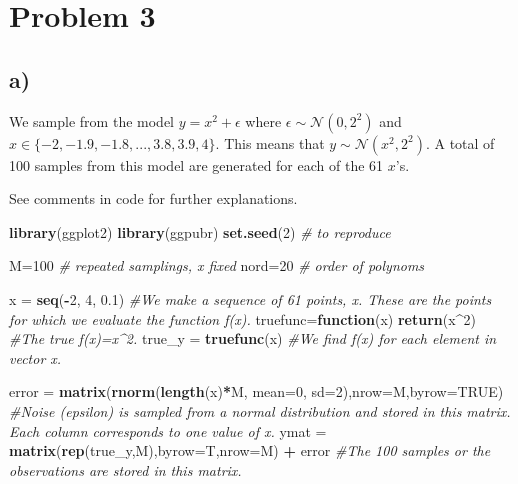 \documentclass[]{article}
\newenvironment{Shaded}{\begin{snugshade}}{\end{snugshade}}
\newcommand{\KeywordTok}[1]{\textcolor[rgb]{0.13,0.29,0.53}{\textbf{#1}}}
\newcommand{\DataTypeTok}[1]{\textcolor[rgb]{0.13,0.29,0.53}{#1}}
\newcommand{\DecValTok}[1]{\textcolor[rgb]{0.00,0.00,0.81}{#1}}
\newcommand{\FloatTok}[1]{\textcolor[rgb]{0.00,0.00,0.81}{#1}}
\newcommand{\StringTok}[1]{\textcolor[rgb]{0.31,0.60,0.02}{#1}}
\newcommand{\CommentTok}[1]{\textcolor[rgb]{0.56,0.35,0.01}{\textit{#1}}}
\newcommand{\OtherTok}[1]{\textcolor[rgb]{0.56,0.35,0.01}{#1}}
\newcommand{\ControlFlowTok}[1]{\textcolor[rgb]{0.13,0.29,0.53}{\textbf{#1}}}
\newcommand{\OperatorTok}[1]{\textcolor[rgb]{0.81,0.36,0.00}{\textbf{#1}}}
\newcommand{\NormalTok}[1]{#1}
\begin{document}
\section{Problem 3}\label{problem-3}

\subsection{a)}\label{a}

We sample from the model \(y=x^2+\epsilon\) where
\(\epsilon \sim \mathcal{N}(0,2^2)\) and
\(x\in \{-2,-1.9,-1.8,...,3.8,3.9,4\}\). This means that
\(y \sim \mathcal{N}(x^2,2^2)\). A total of 100 samples from this model
are generated for each of the 61 \(x\)'s.

See comments in code for further explanations.

\begin{Shaded}
\begin{Highlighting}[]
\KeywordTok{library}\NormalTok{(ggplot2)}
\KeywordTok{library}\NormalTok{(ggpubr)}
\KeywordTok{set.seed}\NormalTok{(}\DecValTok{2}\NormalTok{) }\CommentTok{# to reproduce}

\NormalTok{M=}\DecValTok{100} \CommentTok{# repeated samplings, x fixed }
\NormalTok{nord=}\DecValTok{20} \CommentTok{# order of polynoms}


\NormalTok{x =}\StringTok{ }\KeywordTok{seq}\NormalTok{(}\OperatorTok{-}\DecValTok{2}\NormalTok{, }\DecValTok{4}\NormalTok{, }\FloatTok{0.1}\NormalTok{) }\CommentTok{#We make a sequence of 61 points, x. These are the points for which we evaluate the function f(x).}
\NormalTok{truefunc=}\ControlFlowTok{function}\NormalTok{(x) }\KeywordTok{return}\NormalTok{(x}\OperatorTok{^}\DecValTok{2}\NormalTok{) }\CommentTok{#The true f(x)=x^2. }
\NormalTok{true_y =}\StringTok{ }\KeywordTok{truefunc}\NormalTok{(x) }\CommentTok{#We find f(x) for each element in vector x.}

\NormalTok{error =}\StringTok{ }\KeywordTok{matrix}\NormalTok{(}\KeywordTok{rnorm}\NormalTok{(}\KeywordTok{length}\NormalTok{(x)}\OperatorTok{*}\NormalTok{M, }\DataTypeTok{mean=}\DecValTok{0}\NormalTok{, }\DataTypeTok{sd=}\DecValTok{2}\NormalTok{),}\DataTypeTok{nrow=}\NormalTok{M,}\DataTypeTok{byrow=}\OtherTok{TRUE}\NormalTok{) }\CommentTok{#Noise (epsilon) is sampled from a normal distribution and stored in this matrix. Each column corresponds to one value of x.}
\NormalTok{ymat =}\StringTok{ }\KeywordTok{matrix}\NormalTok{(}\KeywordTok{rep}\NormalTok{(true_y,M),}\DataTypeTok{byrow=}\NormalTok{T,}\DataTypeTok{nrow=}\NormalTok{M) }\OperatorTok{+}\StringTok{ }\NormalTok{error }\CommentTok{#The 100 samples or the observations are stored in this matrix.}


\end{Highlighting}
\end{Shaded}
\end{document}
